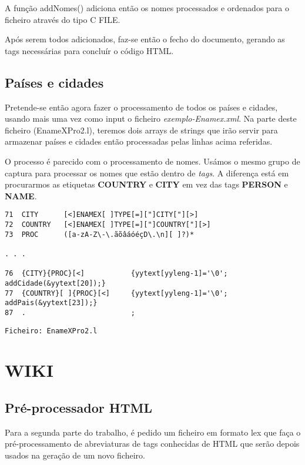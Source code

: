 \documentclass[11pt,a4paper]{report}
\begin{document}
A função addNomes() adiciona então os nomes processados e ordenados para o ficheiro através do tipo C FILE. 

Após serem todos adicionados, faz-se então o fecho do documento, gerando as tags necessárias para concluír o código HTML. 

\pagebreak
\section{Países e cidades}

Pretende-se então agora fazer o processamento de todos os países e cidades, usando mais uma vez como input o ficheiro \emph{exemplo-Enamex.xml}. Na parte deste ficheiro (EnameXPro2.l), teremos dois arrays de strings que irão servir para armazenar países e cidades então processadas pelas linhas acima referidas.

O processo é parecido com o processamento de nomes. Usámos o mesmo grupo de captura para processar os nomes que estão dentro de \emph{tags}. A diferença está em procurarmos as etiquetas \textbf{COUNTRY} e \textbf{CITY} em vez das tags \textbf{PERSON} e \textbf{NAME}.

\begin{verbatim}
71  CITY      [<]ENAMEX[ ]TYPE[=]["]CITY["][>]
72  COUNTRY   [<]ENAMEX[ ]TYPE[=]["]COUNTRY["][>]
73  PROC      ([a-zA-Z\-\.ãõâáóéçD\.\n][ ]?)*

. . .

76  {CITY}{PROC}[<]           {yytext[yyleng-1]='\0'; addCidade(&yytext[20]);}
77  {COUNTRY}[ ]{PROC}[<]     {yytext[yyleng-1]='\0'; addPais(&yytext[23]);}
87  .                         ;
\end{verbatim}
\begin{flushright}
\texttt{Ficheiro: EnameXPro2.l}
\end{flushright}


\raggedbottom
\pagebreak

\chapter{WIKI}
\section{Pré-processador HTML}

Para a segunda parte do trabalho, é pedido um ficheiro em formato lex que faça o pré-processamento de abreviaturas de tags conhecidas de HTML que serão depois usados na geração de um novo ficheiro.
\end{document}
